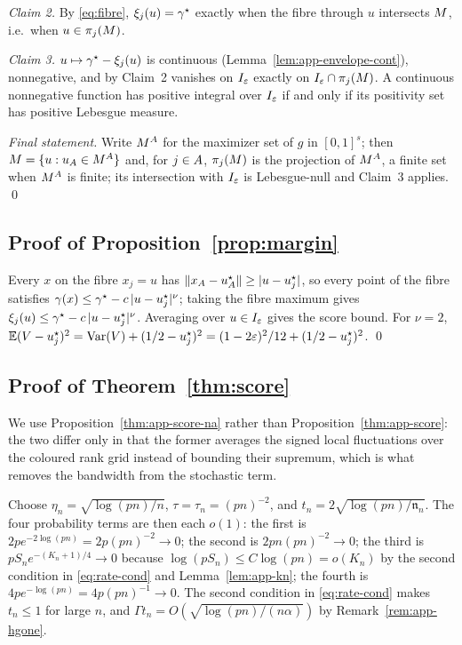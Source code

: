 \emph{Claim 2.}  By \eqref{eq:fibre}, $\xi_j(u)=\gamma^\star$ exactly when the
fibre through $u$ intersects $M$, i.e.\ when $u\in\pi_j(M)$.

\emph{Claim 3.}  $u\mapsto\gamma^\star-\xi_j(u)$ is continuous
(Lemma~\ref{lem:app-envelope-cont}), nonnegative, and by Claim~2 vanishes
on $I_\varepsilon$ exactly on $I_\varepsilon\cap\pi_j(M)$.  A continuous nonnegative function
has positive integral over $I_\varepsilon$ if and only if its positivity set has
positive Lebesgue measure.

\emph{Final statement.}  Write $M^{A}$ for the maximizer set of $g$ in
$[0,1]^{s}$; then $M=\{u:u_{A}\in M^{A}\}$ and, for $j\in A$,
$\pi_j(M)$ is the projection of $M^{A}$, a finite set when $M^{A}$ is
finite; its intersection with $I_\varepsilon$ is Lebesgue-null and Claim~3 applies.
\qed

\subsection{Proof of Proposition~\ref{prop:margin}}

Every $x$ on the fibre $x_j=u$ has
$\|x_{A}-u^\star_{A}\|\ge|u-u^\star_j|$, so every point of the fibre
satisfies
$\gamma(x)\le\gamma^\star-c\,|u-u^\star_j|^\nu$; taking the fibre maximum gives
$\xi_j(u)\le\gamma^\star-c\,|u-u^\star_j|^\nu$.  Averaging
over $u\in I_\varepsilon$ gives the score bound.  For $\nu=2$,
$\mathbb E(V-u_j^\star)^2=\mathrm{Var}(V)+(1/2-u_j^\star)^2
=(1-2\varepsilon)^2/12+(1/2-u_j^\star)^2$.  \qed

\subsection{Proof of Theorem~\ref{thm:score}}

We use Proposition~\ref{thm:app-score-na} rather than
Proposition~\ref{thm:app-score}: the two differ only in that the former
averages the signed local fluctuations over the coloured rank grid
instead of bounding their supremum, which is what removes the bandwidth
from the stochastic term.

Choose $\eta_n=\sqrt{\log(pn)/n}$, $\tau=\tau_n=(pn)^{-2}$, and
$t_n=2\sqrt{\log(pn)/\mathfrak n_n}$.  The four probability terms are
then each $o(1)$: the first is $2pe^{-2\log(pn)}=2p(pn)^{-2}\to0$; the
second is $2pn(pn)^{-2}\to0$; the third is $pS_ne^{-(K_n+1)/4}\to0$
because $\log(pS_n)\le C\log(pn)=o(K_n)$ by the second condition in
\eqref{eq:rate-cond} and Lemma~\ref{lem:app-kn}; the fourth is
$4pe^{-\log(pn)}=4p(pn)^{-1}\to0$.  The second condition in
\eqref{eq:rate-cond} makes $t_n\le1$ for large $n$, and
$\Gamma t_n=O(\sqrt{\log(pn)/(n\alpha)})$ by
Remark~\ref{rem:app-hgone}.

